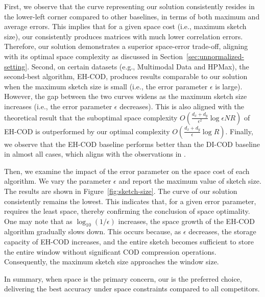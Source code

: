 First, we observe that the curve representing our solution \oursolution consistently resides in the lower-left corner compared to other baselines, in terms of both maximum and average errors.  This implies that for a given space cost (i.e., maximum sketch size), our \oursolution consistently produces matrices with much lower correlation errors. Therefore, our solution demonstrates a superior space-error trade-off, aligning with its optimal space complexity as discussed in Section~\ref{sec:unnormalized-setting}. Second, on certain datasets (e.g., Multimodal Data and HPMax), the second-best algorithm, EH-COD, produces results comparable to our solution when the maximum sketch size is small (i.e., the error parameter $\epsilon$ is large). However, the gap between the two curves widens as the maximum sketch size increases (i.e., the error parameter $\epsilon$ decreases). This is also aligned with the theoretical result that the suboptimal space complexity $O(\frac{d_x + d_y}{\epsilon^2}\log{\epsilon NR})$ of EH-COD is outperformed by our optimal complexity $O(\frac{d_x + d_y}{\epsilon}\log{R})$. Finally, we observe that the EH-COD baseline performs better than the DI-COD baseline in almost all cases, which aligns with the observations in \cite{YaoLCWC24}.

Then, we examine the impact of the error parameter on the space cost of each algorithm. We vary the parameter $\epsilon$ and report the maximum value of sketch size. The results are shown in Figure~\ref{fig:sketch-size}.  The curve of our solution \oursolution consistently remains the lowest. This indicates that, for a given error parameter, \oursolution requires the least space, thereby confirming the conclusion of space optimality. One may note that as $\log_{10}(1/\epsilon)$ increases, the space growth of the EH-COD algorithm gradually slows down. This occurs because, as $\epsilon$ decreases, the storage capacity of EH-COD increases, and the entire sketch becomes sufficient to store the entire window without significant COD compression operations. Consequently, the maximum sketch size approaches the window size.


In summary, when space is the primary concern, our \oursolution is the preferred choice, delivering the best accuracy under space constraints compared to all competitors.

